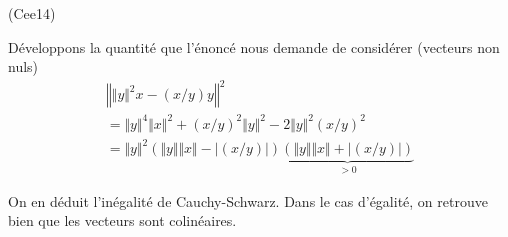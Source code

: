 \begin{tiny}(Cee14)\end{tiny} Développons la quantité que l'énoncé nous demande de considérer (vecteurs non nuls)
\begin{multline*}
 \left\Vert \Vert y\Vert^2x - (x/y)y \right \Vert^2\\
= \Vert y\Vert^4\Vert x\Vert^2 + (x/y)^2 \Vert y\Vert^2 -2\Vert y\Vert^2(x/y)^2\\
= \Vert y\Vert^2\left(\Vert y\Vert\Vert x\Vert -|(x/y)|\right)
\underset{> 0}{\underbrace{\left(\Vert y\Vert\Vert x\Vert +|(x/y)|\right)}} 
\end{multline*}

On en déduit l'inégalité de Cauchy-Schwarz. Dans le cas d'égalité, on retrouve bien que les vecteurs sont colinéaires.

